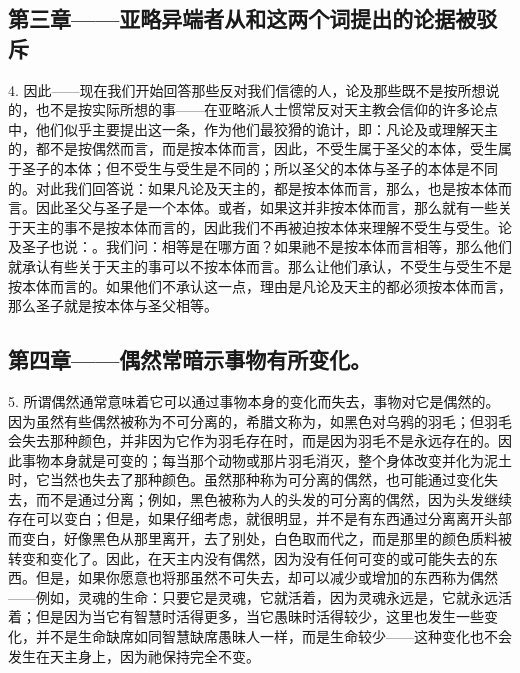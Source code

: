 \subsection{第三章——亚略异端者从和这两个词提出的论据被驳斥}

4. 因此——现在我们开始回答那些反对我们信德的人，论及那些既不是按所想说的，也不是按实际所想的事——在亚略派人士惯常反对天主教会信仰的许多论点中，他们似乎主要提出这一条，作为他们最狡猾的诡计，即：凡论及或理解天主的，都不是按偶然而言，而是按本体而言，因此，不受生属于圣父的本体，受生属于圣子的本体；但不受生与受生是不同的；所以圣父的本体与圣子的本体是不同的。对此我们回答说：如果凡论及天主的，都是按本体而言，那么，也是按本体而言。因此圣父与圣子是一个本体。或者，如果这并非按本体而言，那么就有一些关于天主的事不是按本体而言的，因此我们不再被迫按本体来理解不受生与受生。论及圣子也说：。我们问：相等是在哪方面？如果祂不是按本体而言相等，那么他们就承认有些关于天主的事可以不按本体而言。那么让他们承认，不受生与受生不是按本体而言的。如果他们不承认这一点，理由是凡论及天主的都必须按本体而言，那么圣子就是按本体与圣父相等。\par


\subsection{第四章——偶然常暗示事物有所变化。}

5. 所谓偶然通常意味着它可以通过事物本身的变化而失去，事物对它是偶然的。因为虽然有些偶然被称为不可分离的，希腊文称为，如黑色对乌鸦的羽毛；但羽毛会失去那种颜色，并非因为它作为羽毛存在时，而是因为羽毛不是永远存在的。因此事物本身就是可变的；每当那个动物或那片羽毛消灭，整个身体改变并化为泥土时，它当然也失去了那种颜色。虽然那种称为可分离的偶然，也可能通过变化失去，而不是通过分离；例如，黑色被称为人的头发的可分离的偶然，因为头发继续存在可以变白；但是，如果仔细考虑，就很明显，并不是有东西通过分离离开头部而变白，好像黑色从那里离开，去了别处，白色取而代之，而是那里的颜色质料被转变和变化了。因此，在天主内没有偶然，因为没有任何可变的或可能失去的东西。但是，如果你愿意也将那虽然不可失去，却可以减少或增加的东西称为偶然——例如，灵魂的生命：只要它是灵魂，它就活着，因为灵魂永远是，它就永远活着；但是因为当它有智慧时活得更多，当它愚昧时活得较少，这里也发生一些变化，并不是生命缺席如同智慧缺席愚昧人一样，而是生命较少——这种变化也不会发生在天主身上，因为祂保持完全不变。\par

